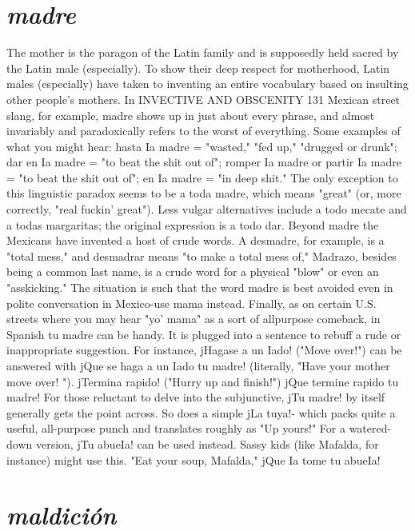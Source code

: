 \documentclass[14pt,a4paper,oneside]{memoir}
\begin{document}
\section{\emph{madre}}

The mother is the paragon of the Latin family and is supposedly held sacred by the Latin male (especially). To show their deep respect for motherhood, Latin males (especially) have taken to inventing an entire vocabulary based on insulting other people's mothers. In
INVECTIVE AND OBSCENITY 131
Mexican street slang, for example, madre shows up in just about every
phrase, and almost invariably and paradoxically refers to the worst of
everything. Some examples of what you might hear: hasta Ia madre =
"wasted," "fed up," "drugged or drunk"; dar en Ia madre = "to beat
the shit out of"; romper Ia madre or partir Ia madre = "to beat the
shit out of"; en Ia madre = "in deep shit." The only exception to this
linguistic paradox seems to be a toda madre, which means "great" (or,
more correctly, "real fuckin' great"). Less vulgar alternatives include
a todo mecate and a todas margaritas; the original expression is a
todo dar.
Beyond madre the Mexicans have invented a host of crude
words. A desmadre, for example, is a "total mess," and desmadrar
means "to make a total mess of," Madrazo, besides being a common
last name, is a crude word for a physical "blow" or even an "asskicking." The situation is such that the word madre is best avoided
even in polite conversation in Mexico-use mama instead. Finally, as
on certain U.S. streets where you may hear "yo' mama" as a sort of allpurpose comeback, in Spanish tu madre can be handy. It is plugged
into a sentence to rebuff a rude or inappropriate suggestion. For instance, jHagase a un Iado! ("Move over!") can be answered with jQue
se haga a un Iado tu madre! (literally, "Have your mother move over! ").
jTermina rapido! ("Hurry up and finish!") jQue termine rapido tu
madre! For those reluctant to delve into the subjunctive, jTu madre!
by itself generally gets the point across. So does a simple jLa tuya!-
which packs quite a useful, all-purpose punch and translates roughly
as "Up yours!" For a watered-down version, jTu abueIa! can be used
instead. Sassy kids (like Mafalda, for instance) might use this. "Eat
your soup, Mafalda," jQue Ia tome tu abueIa!

\section{\emph{maldición}}
\end{document}
